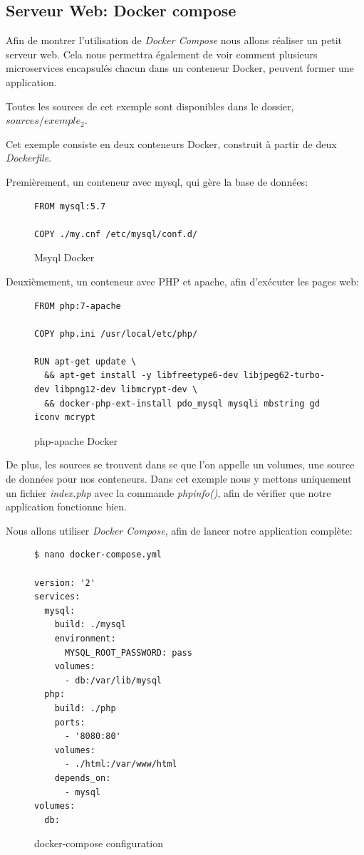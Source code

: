 \subsection{Serveur Web: Docker compose}
Afin de montrer l'utilisation de \emph{Docker Compose} nous allons réaliser un petit serveur web. Cela nous permettra également de voir comment plusieurs microservices encapsulés chacun dans un conteneur Docker, peuvent former une application.

Toutes les sources de cet exemple sont disponibles dans le dossier, \emph{$sources/exemple_2$}.

Cet exemple consiste en deux conteneurs Docker, construit à partir de deux \emph{Dockerfile}.

Premièrement, un conteneur avec mysql, qui gère la base de données:

\begin{figure}[H] 
\centering 
\begin{lstlisting}[frame=single]
FROM mysql:5.7

COPY ./my.cnf /etc/mysql/conf.d/
\end{lstlisting}
\caption[mysql Docker]{Msyql Docker}
\label{fig:mysqlDocker} 
\end{figure}

Deuxièmement, un conteneur avec PHP et apache, afin d'exécuter les pages web:

\begin{figure}[H] 
\centering 
\begin{lstlisting}[frame=single]
FROM php:7-apache

COPY php.ini /usr/local/etc/php/

RUN apt-get update \
  && apt-get install -y libfreetype6-dev libjpeg62-turbo-dev libpng12-dev libmcrypt-dev \
  && docker-php-ext-install pdo_mysql mysqli mbstring gd iconv mcrypt
\end{lstlisting}
\caption[php-apache Docker]{php-apache Docker}
\label{fig:phpApacheDocker} 
\end{figure}

De plus, les sources se trouvent dans se que l'on appelle un volumes, une source de données pour nos conteneurs. Dans cet exemple nous y mettons uniquement un fichier \emph{index.php} avec la commande \emph{phpinfo()}, afin de vérifier que notre application fonctionne bien.

Nous allons utiliser \emph{Docker Compose}, afin de lancer notre application complète:

\begin{figure}[H] 
\centering 
\begin{lstlisting}[frame=single]
$ nano docker-compose.yml

version: '2'
services:
  mysql:
    build: ./mysql
    environment:
      MYSQL_ROOT_PASSWORD: pass
    volumes:
      - db:/var/lib/mysql
  php:
    build: ./php
    ports:
      - '8080:80'
    volumes:
      - ./html:/var/www/html
    depends_on:
      - mysql
volumes:
  db:

\end{lstlisting}
\caption[Code - docker-compose configuration]{docker-compose configuration}
\label{fig:composeConfig} 
\end{figure}

